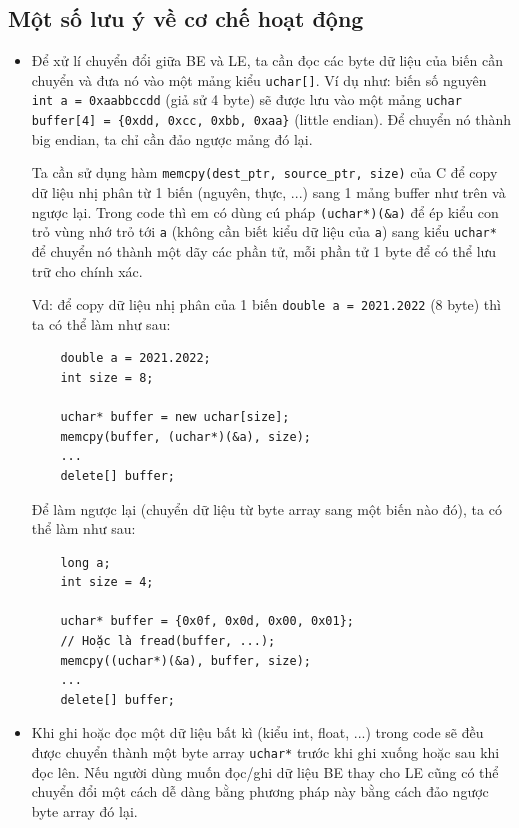 \documentclass[12pt, final]{article}
\newcommand{\code}[1]{\texttt{#1}}
\begin{document}
\subsection{Một số lưu ý về cơ chế hoạt động}
\begin{itemize}
    \item Để xử lí chuyển đổi giữa BE và LE, ta cần đọc các byte dữ liệu của biến cần chuyển và đưa nó vào một mảng kiểu \code{uchar[]}. Ví dụ như: biến số nguyên  \code{int a = 0xaabbccdd} (giả sử 4 byte) sẽ được lưu vào một mảng \code{uchar buffer[4] = \{0xdd, 0xcc, 0xbb, 0xaa\}} (little endian). Để chuyển nó thành big endian, ta chỉ cần đảo ngược mảng đó lại. \par 
    
    Ta cần sử dụng hàm \code{memcpy(dest\_ptr, source\_ptr, size)} của C để copy dữ liệu nhị phân từ 1 biến (nguyên, thực, ...) sang 1 mảng buffer như trên và ngược lại. Trong code thì em có dùng cú pháp \code{(uchar*)(\&a)} để ép kiểu con trỏ vùng nhớ trỏ tới \code{a} (không cần biết kiểu dữ liệu của \code{a}) sang kiểu \code{uchar*} để chuyển nó thành một dãy các phần tử, mỗi phần tử 1 byte để có thể lưu trữ cho chính xác.\cite{byteconv}\par 
    Vd: để copy dữ liệu nhị phân của 1 biến \code{double a = 2021.2022} (8 byte) thì ta có thể làm như sau:
    \begin{verbatim}
    double a = 2021.2022;
    int size = 8;
    
    uchar* buffer = new uchar[size];
    memcpy(buffer, (uchar*)(&a), size);
    ...
    delete[] buffer;
    \end{verbatim}    
    Để làm ngược lại (chuyển dữ liệu từ byte array sang một biến nào đó), ta có thể làm như sau:
    \begin{verbatim}
    long a;
    int size = 4;
    
    uchar* buffer = {0x0f, 0x0d, 0x00, 0x01};
    // Hoặc là fread(buffer, ...);
    memcpy((uchar*)(&a), buffer, size);
    ...
    delete[] buffer;
    \end{verbatim}  
    
    \item Khi ghi hoặc đọc một dữ liệu bất kì (kiểu int, float, ...) trong code sẽ đều được chuyển thành một byte array \code{uchar*} trước khi ghi xuống hoặc sau khi đọc lên. Nếu người dùng muốn đọc/ghi dữ liệu BE thay cho LE cũng có thể chuyển đổi một cách dễ dàng bằng phương pháp này bằng cách đảo ngược byte array đó lại.
    

\end{itemize}
\end{document}
